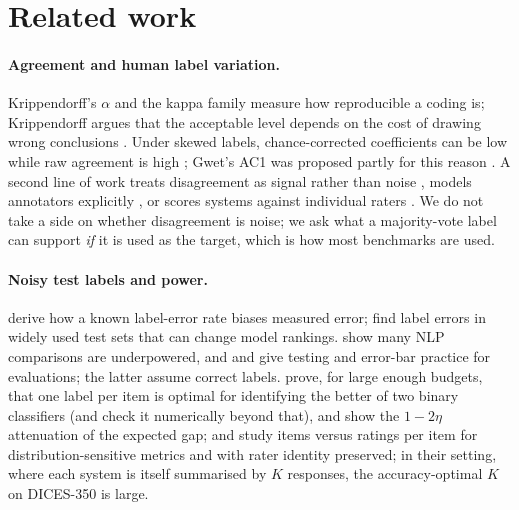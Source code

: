 \documentclass[11pt]{article}
\begin{document}
\section{Related work}
\paragraph{Agreement and human label variation.} Krippendorff's $\alpha$ \citep{krippendorff2011computing,krippendorff2004content} and the kappa family \citep{artstein2008survey} measure how reproducible a coding is; Krippendorff argues that the acceptable level depends on the cost of drawing wrong conclusions \citep{krippendorff2004reliability}. Under skewed labels, chance-corrected coefficients can be low while raw agreement is high \citep{feinstein1990high}; Gwet's AC1 was proposed partly for this reason \citep{gwet2008computing}. A second line of work treats disagreement as signal rather than noise \citep{plank2022problem,basile2021need,uma2021learning,davani2022dealing}, models annotators explicitly \citep{paun2018comparing}, or scores systems against individual raters \citep{gordon2021disagreement,resnick2021principled}. We do not take a side on whether disagreement is noise; we ask what a majority-vote label can support \emph{if} it is used as the target, which is how most benchmarks are used.

\paragraph{Noisy test labels and power.} \citet{lam2003evaluating} derive how a known label-error rate biases measured error; \citet{northcutt2021pervasive} find label errors in widely used test sets that can change model rankings. \citet{card2020little} show many NLP comparisons are underpowered, and \citet{dror2018hitchhikers} and \citet{miller2024adding} give testing and error-bar practice for evaluations; the latter assume correct labels. \citet{dorner2024dont} prove, for large enough budgets, that one label per item is optimal for identifying the better of two binary classifiers (and check it numerically beyond that), and show the $1-2\eta$ attenuation of the expected gap; \citet{homan2026many} and \citet{pandita2026improving} study items versus ratings per item for distribution-sensitive metrics and with rater identity preserved; in their setting, where each system is itself summarised by $K$ responses, the accuracy-optimal $K$ on DICES-350 is large.
\end{document}
